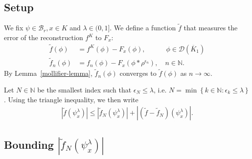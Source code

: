 \subsection*{Setup} 

We fix \(\psi \in \mathcal{B}_r, x \in K\) and \(\lambda \in (0,1]\). We define a function \(\tilde f\) that measures the error of the reconstruction \(f^K\) to \(F_x\):  
\begin{align*}
    \tilde f(\phi) &= f^K(\phi) - F_x(\phi), \quad \qquad \phi \in \mathcal{D}(\overline{K}_1)\\
    \tilde f_n(\phi) &= f_n(\phi) - F_x(\phi * \rho^{\epsilon_n}), \quad n \in \mathbb{N}.
\end{align*}
By Lemma~\ref{mollifier-lemma}, \(\tilde f_n(\phi)\) converges to \(\tilde f(\phi)\) as \(n \to \infty\).

Let \(N \in \mathbb{N}\) be the smallest index such that \(\epsilon_N \leq \lambda\), i.e. \(N = \min \left\{ k \in \mathbb{N} : \epsilon_k \leq \lambda  \right\}\). Using the triangle inequality, we then write 
\begin{align*}
    |\tilde f (\psi^\lambda_x)| \leq  |\tilde f_N (\psi^\lambda_x)| + |(\tilde f - \tilde f_N) (\psi^\lambda_x)|.
\end{align*}

\subsection*{Bounding \(|\tilde f_N (\psi^\lambda_x)|\)} 

